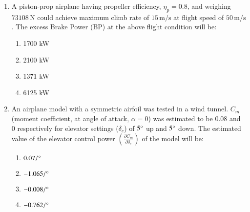 \documentclass[journal]{IEEEtran}
\begin{document}
\begin{enumerate}[start=18]
\item  A piston-prop airplane having propeller efficiency, $\eta_p = 0.8$, and weighing $73108 \, \text{N}$ could achieve maximum climb rate of $15 \, \text{m/s}$ at flight speed of $50 \, \text{m/s}$. The excess Brake Power (BP) at the above flight condition will be:
\begin{multicols}{4}
\begin{enumerate}
\item 1700 kW
\item 2100 kW
\item 1371 kW
\item 6125 kW
\end{enumerate}
\end{multicols}
\item  An airplane model with a symmetric airfoil was tested in a wind tunnel. $C_{m}$ (moment coefficient, at angle of attack, $\alpha = 0$) was estimated to be 0.08 and 0 respectively for elevator settings ($\delta_e$) of $5 \degree$ up and $5 \degree$ down. The estimated value of the elevator control power $\left( \frac{\partial C_m}{\partial \delta_e} \right)$ of the model will be:
\begin{multicols}{4}
\begin{enumerate}
\item $0.07 / \degree$
\item $-1.065 / \degree$
\item $-0.008 / \degree$
\item $-0.762 / \degree$
\end{enumerate}
\end{multicols}



\end{enumerate}
\end{document}
